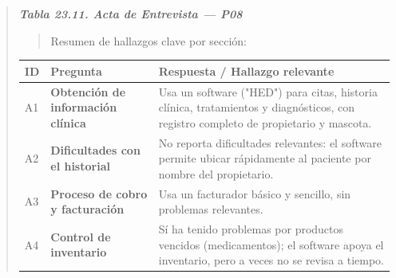 \documentclass[
]{article}
\newcounter{none} %
\begin{document}
\begin{quote}
\protect{}\label{_bookmark_P08_acta}{}\emph{\textbf{Tabla 23.11. Acta de Entrevista --- P08}}

\begin{quote}
Resumen de hallazgos clave por sección:
\end{quote}

{\def\LTcaptype{none} %
\begin{longtable}[]{|
  >{\centering\arraybackslash}p{}|
  >{\raggedright\arraybackslash}p{}|
  >{\raggedright\arraybackslash}p{}|}
\hline
\begin{minipage}[b]{\linewidth}\centering
\textbf{ID}
\end{minipage} & \begin{minipage}[b]{\linewidth}\centering
\textbf{Pregunta}
\end{minipage} & \begin{minipage}[b]{\linewidth}\raggedright
\textbf{Respuesta / Hallazgo relevante}
\end{minipage} \\
\hline
\endhead
\hline
\endlastfoot
A1 & \textbf{Obtención de información clínica} &
\begin{minipage}[t]{\linewidth}\raggedright
Usa un software ("HED") para citas, historia clínica, tratamientos y diagnósticos, con registro completo de propietario y mascota.
\end{minipage} \\
\hline
A2 & \textbf{Dificultades con el historial} &
\begin{minipage}[t]{\linewidth}\raggedright
No reporta dificultades relevantes: el software permite ubicar rápidamente al paciente por nombre del propietario.
\end{minipage} \\
\hline
A3 & \textbf{Proceso de cobro y facturación} &
\begin{minipage}[t]{\linewidth}\raggedright
Usa un facturador básico y sencillo, sin problemas relevantes.
\end{minipage} \\
\hline
A4 & \textbf{Control de inventario} &
\begin{minipage}[t]{\linewidth}\raggedright
Sí ha tenido problemas por productos vencidos (medicamentos); el software apoya el inventario, pero a veces no se revisa a tiempo.
\end{minipage} \\

\end{longtable}}
\end{quote}
\end{document}
